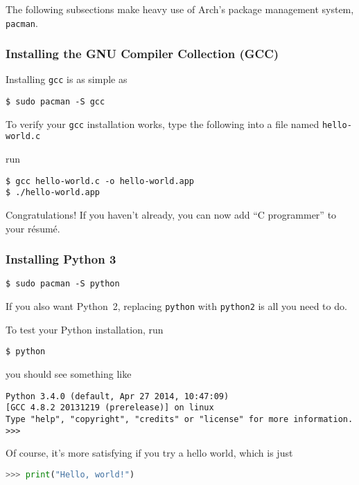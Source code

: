 \documentclass[12pt,letterpaper]{article}
\begin{document}
The following subsections make heavy use of Arch's package management system, \lstinline{pacman}.

\subsubsection{Installing the GNU Compiler Collection (GCC)}

Installing \lstinline{gcc} is as simple as
\begin{lstlisting}
$ sudo pacman -S gcc
\end{lstlisting}

To verify your \lstinline{gcc} installation works, type the following into a file named \lstinline{hello-world.c}



run
\begin{lstlisting}
$ gcc hello-world.c -o hello-world.app
$ ./hello-world.app
\end{lstlisting}

Congratulations! If you haven't already, you can now add ``C programmer'' to your r\'esum\'e.

\subsubsection{Installing Python 3}

\begin{lstlisting}
$ sudo pacman -S python
\end{lstlisting}

If you also want Python~2, replacing \lstinline{python} with \lstinline{python2} is all you need to do.

To test your Python installation, run
\begin{lstlisting}
$ python
\end{lstlisting}
you should see something like
\begin{lstlisting}
Python 3.4.0 (default, Apr 27 2014, 10:47:09) 
[GCC 4.8.2 20131219 (prerelease)] on linux
Type "help", "copyright", "credits" or "license" for more information.
>>>
\end{lstlisting}
Of course, it's more satisfying if you try a hello world, which is just
\begin{lstlisting}[language=python,showstringspaces=false,basicstyle=\ttfamily]
>>> print("Hello, world!")
\end{lstlisting}
\end{document}
